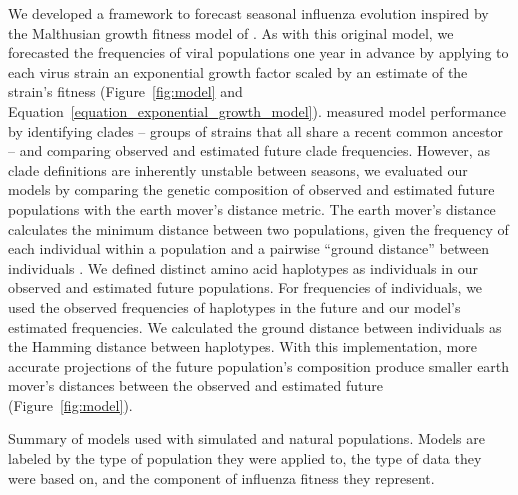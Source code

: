 We developed a framework to forecast seasonal influenza evolution inspired by the Malthusian growth fitness model of \cite{Luksza:2014hj}.
As with this original model, we forecasted the frequencies of viral populations one year in advance by applying to each virus strain an exponential growth factor scaled by an estimate of the strain's fitness (Figure~\ref{fig:model} and Equation~\ref{equation_exponential_growth_model}).
\cite{Luksza:2014hj} measured model performance by identifying clades -- groups of strains that all share a recent common ancestor -- and comparing observed and estimated future clade frequencies.
However, as clade definitions are inherently unstable between seasons, we evaluated our models by comparing the genetic composition of observed and estimated future populations with the earth mover's distance metric.
The earth mover's distance calculates the minimum distance between two populations, given the frequency of each individual within a population and a pairwise ``ground distance'' between individuals \citep{Rubner1998}.
We defined distinct amino acid haplotypes as individuals in our observed and estimated future populations.
For frequencies of individuals, we used the observed frequencies of haplotypes in the future and our model's estimated frequencies.
We calculated the ground distance between individuals as the Hamming distance between haplotypes.
With this implementation, more accurate projections of the future population's composition produce smaller earth mover's distances between the observed and estimated future (Figure~\ref{fig:model}).

\begin{table}
  \begin{center}
    \scalebox{0.7}{
      
    }
    \caption{
      Summary of models used with simulated and natural populations.
      Models are labeled by the type of population they were applied to, the type of data they were based on, and the component of influenza fitness they represent.
    }
    \label{table_model_summary}
  \end{center}
\end{table}

